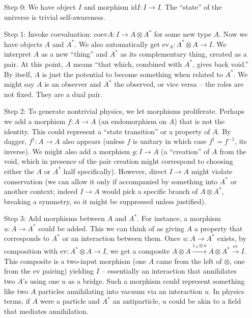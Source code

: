 \documentclass{article}
\begin{document}
\begin{enumerate}
\item[Step 0:] We have object $I$ and morphism $\mathrm{id}I: I \to I$. The “state” of the universe is trivial self-awareness.
\item[Step 1:] Invoke coevaluation: $\text{coev}{A}: I \to A \otimes A^*$ for some new type $A$. Now we have objects $A$ and $A^*$. We also automatically get $\text{ev}_{A}: A^* \otimes A \to I$. We interpret $A$ as a new “thing” and $A^*$ as its complementary thing, created as a pair. At this point, $A$ means “that which, combined with $A^*$, gives back void.” By itself, $A$ is just the potential to become something when related to $A^*$. We might say $A$ is an observer and $A^*$ the observed, or vice versa – the roles are not fixed. They are a dual pair.
\item[Step 2:] To generate nontrivial physics, we let morphisms proliferate. Perhaps we add a morphism $f: A \to A$ (an endomorphism on $A$) that is not the identity. This could represent a “state transition” or a property of $A$. By dagger, $f^\dagger: A \to A$ also appears (unless $f$ is unitary in which case $f^\dagger = f^{-1}$, its inverse). We might also add a morphism $g: I \to A$ (a “creation” of $A$ from the void, which in presence of the pair creation might correspond to choosing either the $A$ or $A^*$ half specifically). However, direct $I \to A$ might violate conservation (we can allow it only if accompanied by something into $A^*$ or another context; indeed $I \to A$ would pick a specific branch of $A\otimes A^*$, breaking a symmetry, so it might be suppressed unless justified).
\item[Step 3:] Add morphisms between $A$ and $A^*$. For instance, a morphism $u: A \to A^*$ could be added. This we can think of as giving $A$ a property that corresponds to $A^*$ or an interaction between them. Once $u: A \to A^*$ exists, by composition with $\text{ev}: A^* \otimes A \to I$, we get a composite $A \otimes A \xrightarrow{1_A \otimes u} A \otimes A^* \xrightarrow{\text{ev}} I$. This composite is a two-input morphism (one $A$ came from the left of $\otimes$, one from the ev pairing) yielding $I$ – essentially an interaction that annihilates two $A$’s using one $u$ as a bridge. Such a morphism could represent something like two $A$ particles annihilating into vacuum via an interaction $u$. In physics terms, if $A$ were a particle and $A^*$ an antiparticle, $u$ could be akin to a field that mediates annihilation.
\end{enumerate}
\end{document}
